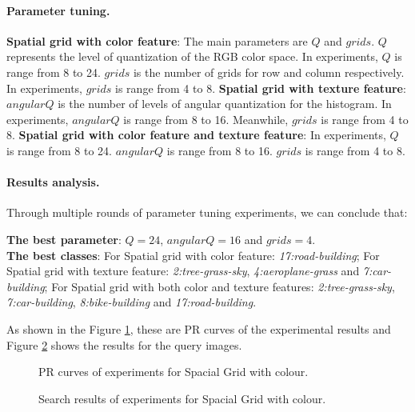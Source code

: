 \documentclass{article}
\begin{document}
\paragraph{Parameter tuning.}
\textbf{Spatial grid with color feature}: The main parameters are $Q$ and $grids$. $Q$ represents the level of quantization of the RGB color space. In experiments, $Q$ is range from 8 to 24. $grids$ is the number of grids for row and column respectively. In experiments, $grids$ is range from 4 to 8.
\textbf{Spatial grid with texture feature}: $angularQ$ is the number of levels of angular quantization for the histogram. In experiments, $angularQ$ is range from 8 to 16. Meanwhile, $grids$ is range from 4 to 8. 
\textbf{Spatial grid with color feature and texture feature}: In experiments, $Q$ is range from 8 to 24.
$angularQ$ is range from 8 to 16. $grids$ is range from 4 to 8. 

\paragraph{Results analysis.}
Through multiple rounds of parameter tuning experiments, we can conclude that:

\noindent \textbf{The best parameter}: $Q = 24$, $angularQ = 16$ and $grids = 4$. \\
\textbf{The best classes}: For Spatial grid with color feature: \textit{17:road-building}; For Spatial grid with texture feature: \textit{2:tree-grass-sky}, \textit{4:aeroplane-grass} and \textit{7:car-building}; For Spatial grid with both color and texture features: \textit{2:tree-grass-sky}, \textit{7:car-building}, \textit{8:bike-building} and \textit{17:road-building}.

As shown in the Figure \ref{fig:spacialGridcolourPR}, these are PR curves of the experimental results and Figure \ref{fig:spacialGridcolourResult} shows the results for the query images.

\begin{figure}[!tbp]
  \centering
  \hfill
  \hfill
  \caption{\label{fig:spacialGridcolourPR} PR curves of experiments for Spacial Grid with colour.}
\end{figure}

\begin{figure}[!tbp]
  \centering
  \hfill
  \hfill
  \caption{\label{fig:spacialGridcolourResult} Search results of experiments for Spacial Grid with colour.}
\end{figure}
\end{document}
